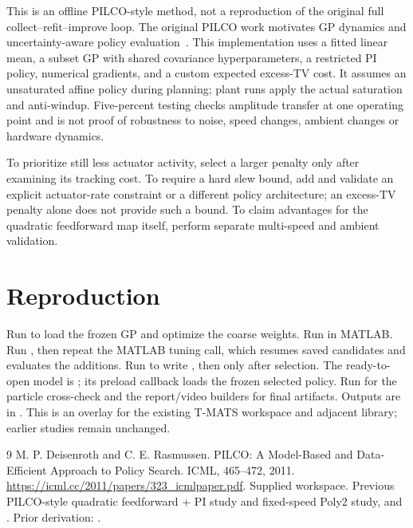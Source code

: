 \documentclass[11pt,a4paper]{article}
\begin{document}
This is an offline PILCO-style method, not a reproduction of the original full collect--refit--improve loop. The original PILCO work motivates GP dynamics and uncertainty-aware policy evaluation~\cite{pilco}. This implementation uses a fitted linear mean, a subset GP with shared covariance hyperparameters, a restricted PI policy, numerical gradients, and a custom expected excess-TV cost. It assumes an unsaturated affine policy during planning; plant runs apply the actual saturation and anti-windup. Five-percent testing checks amplitude transfer at one operating point and is not proof of robustness to noise, speed changes, ambient changes or hardware dynamics.

To prioritize still less actuator activity, select a larger penalty only after examining its tracking cost. To require a hard slew bound, add and validate an explicit actuator-rate constraint or a different policy architecture; an excess-TV penalty alone does not provide such a bound. To claim advantages for the quadratic feedforward map itself, perform separate multi-speed and ambient validation.

\section{Reproduction}
Run  to load the frozen GP and optimize the coarse weights. Run  in MATLAB. Run , then repeat the MATLAB tuning call, which resumes saved candidates and evaluates the additions. Run  to write , then  only after selection. The ready-to-open model is ; its preload callback loads the frozen selected policy. Run  for the particle cross-check and the report/video builders for final artifacts. Outputs are in . This is an overlay for the existing T-MATS workspace and adjacent library; earlier studies remain unchanged.

\begin{thebibliography}{9}
 M. P. Deisenroth and C. E. Rasmussen. PILCO: A Model-Based and Data-Efficient Approach to Policy Search. ICML, 465--472, 2011. \url{https://icml.cc/2011/papers/323_icmlpaper.pdf}.
 Supplied workspace. Previous PILCO-style quadratic feedforward + PI study and fixed-speed Poly2 study,  and . Prior derivation: .
\end{thebibliography}
\end{document}

